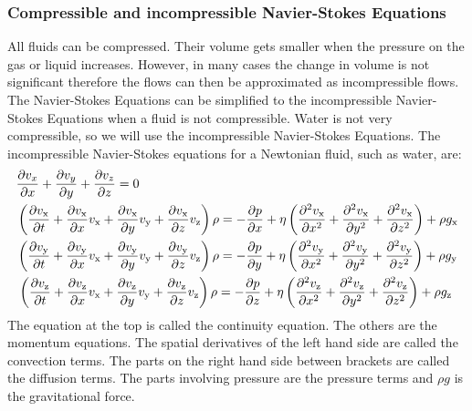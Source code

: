 \documentclass{article}
\begin{document}
\subsubsection{Compressible and incompressible Navier-Stokes Equations}
All fluids can be compressed. Their volume gets smaller when the pressure on the gas or liquid increases. However, in many cases the change in volume is not significant therefore the flows can then be approximated as incompressible flows. The Navier-Stokes Equations can be simplified to the incompressible Navier-Stokes Equations when a fluid is not compressible. Water is not very compressible\cite{NSE features}, so we will use the incompressible Navier-Stokes Equations. The incompressible Navier-Stokes equations for a Newtonian fluid, such as water, are:\cite{Navier Stokes incompressible} \cite{NASA NSE}
\begin{equation}
\begin{aligned}
&\pdv{v_{x}}{x}+\pdv{v_{y}}{y}+\pdv{v_{z}}{z}=0\\
&\left(\frac{\partial v_{\mathrm{x}}}{\partial t}+\frac{\partial v_{\mathrm{x}}}{\partial x} v_{\mathrm{x}}+\frac{\partial v_{\mathrm{x}}}{\partial y} v_{\mathrm{y}}+\frac{\partial v_{\mathrm{x}}}{\partial z} v_{\mathrm{z}}\right) \rho=-\frac{\partial p}{\partial x}+\eta\left(\frac{\partial^{2} v_{\mathrm{x}}}{\partial x^{2}}+\frac{\partial^{2} v_{\mathrm{x}}}{\partial y^{2}}+\frac{\partial^{2} v_{\mathrm{x}}}{\partial z^{2}}\right)+\rho g_{\mathrm{x}}\\
&\left(\frac{\partial v_{\mathrm{y}}}{\partial t}+\frac{\partial v_{\mathrm{y}}}{\partial x} v_{\mathrm{x}}+\frac{\partial v_{\mathrm{y}}}{\partial y} v_{\mathrm{y}}+\frac{\partial v_{\mathrm{y}}}{\partial z} v_{\mathrm{z}}\right) \rho=-\frac{\partial p}{\partial y}+\eta\left(\frac{\partial^{2} v_{\mathrm{y}}}{\partial x^{2}}+\frac{\partial^{2} v_{\mathrm{y}}}{\partial y^{2}}+\frac{\partial^{2} v_{\mathrm{y}}}{\partial z^{2}}\right)+\rho g_{\mathrm{y}}\\
&\left . \left(\frac{\partial v_{\mathrm{z}}}{\partial t}+\frac{\partial v_{\mathrm{z}}}{\partial x} v_{\mathrm{x}}+\frac{\partial v_{\mathrm{z}}}{\partial y} v_{\mathrm{y}}+\frac{\partial v_{\mathrm{z}}}{\partial z} v_{\mathrm{z}}\right) \rho=-\frac{\partial p}{\partial z}+\eta\left(\frac{\partial^{2} v_{\mathrm{z}}}{\partial x^{2}}+\frac{\partial^{2} v_{\mathrm{z}}}{\partial y^{2}}+\frac{\partial^{2} v_{\mathrm{z}}}{\partial z^{2}}\right)+\rho g_{\mathrm{z}}\right .
\end{aligned}
\label{NSE incompressible}
\end{equation}
The equation at the top is called the continuity equation. The others are the momentum equations. The spatial derivatives of the left hand side are called the convection terms. The parts on the right hand side between brackets are called the diffusion terms. The parts involving pressure are the pressure terms and \(\rho g\) is the gravitational force.
\end{document}
